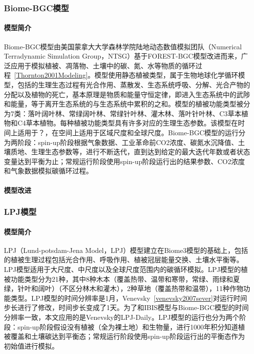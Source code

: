 
\subsubsection{Biome-BGC模型}
\paragraph{模型简介} Biome-BGC模型由美国蒙拿大大学森林学院陆地动态数值模拟团队（Numerical Terradynamic Simulation Group，NTSG）基于FOREST-BGC模型改进而来，广泛应用于模拟植被、凋落物、土壤中的碳、氮、水等物质的循环过程~\ref{Thornton2001Modeling}。模型使用静态植被类型，属于生物地球化学循环模型，包括的生理生态过程有光合作用、蒸散发、生态系统呼吸、分解、光合产物的分配以及植物的死亡，基本原理是物质和能量守恒定律，即进入生态系统中的武陟和能量，等于离开生态系统的与生态系统中累积的之和。模型的植被功能类型被分为7类：落叶阔叶林、常绿阔叶林、常绿针叶林、灌木林、落叶针叶林、C3草本植物和C4草本植物。每种植被功能类型具有许多对应的生理生态参数。该模型在时间上适用于？，在空间上适用于区域尺度和全球尺度。Biome-BGC模型的运行分为两阶段：spin-up阶段根据气象数据、工业革命前CO2浓度、碳氮水沉降值、土壤质地、生理生态参数等，进行不断迭代，直到达到给定的最大迭代年数或者状态变量达到平衡为止；常规运行阶段使用spin-up阶段运行出的结果参数、CO2浓度和气象数据模拟碳循环过程。

\paragraph{模型改进} 

\subsubsection{LPJ模型}
\paragraph{模型简介} LPJ（Lund-potsdam-Jena Model，LPJ）模型建立在Biome3模型的基础上，包括的植被生理过程包括光合作用、呼吸作用、植被冠层能量交换、土壤水平衡等。LPJ模型适用于大尺度、中尺度以及全球尺度范围内的碳循环模拟。LPJ模型的植被功能类型分为21种，其中8种木本（覆盖热带、温带和寒带，常绿、雨绿和夏绿，针叶和阔叶）（不区分林木和灌木），2种草地（覆盖热带和温带），11种作物功能类型。LPJ模型的时间分辨率是1月，Venevsky~\ref{venevsky2007sever}对运行时间步长进行了修改，时间步长变成了1天。为了和IBIS模型与Biome-BGC模型的时间分辨率一致，本文应用的是Venevsky的LPJ-Daily。LPJ模型的运行也分为两个阶段：spin-up阶段假设没有植被（全为裸土地）和生物量，进行1000年积分知道植被覆盖和土壤碳达到平衡态；常规运行阶段使用spin-up阶段运行出的平衡态作为初始值进行模拟。

